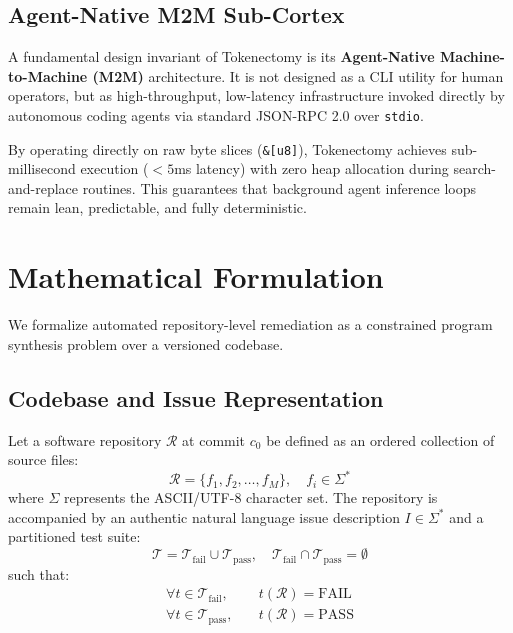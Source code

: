 \documentclass[10pt,twocolumn,letterpaper]{article}
\begin{document}
\subsection{Agent-Native M2M Sub-Cortex}
A fundamental design invariant of Tokenectomy is its \textbf{Agent-Native Machine-to-Machine (M2M)} architecture. It is not designed as a CLI utility for human operators, but as high-throughput, low-latency infrastructure invoked directly by autonomous coding agents via standard JSON-RPC 2.0 over \texttt{stdio}. 

By operating directly on raw byte slices (\texttt{\&[u8]}), Tokenectomy achieves sub-millisecond execution ($<5$ms latency) with zero heap allocation during search-and-replace routines. This guarantees that background agent inference loops remain lean, predictable, and fully deterministic.

\section{Mathematical Formulation}

We formalize automated repository-level remediation as a constrained program synthesis problem over a versioned codebase.

\subsection{Codebase and Issue Representation}
Let a software repository $\mathcal{R}$ at commit $c_0$ be defined as an ordered collection of source files:
\begin{equation}
    \mathcal{R} = \{ f_1, f_2, \dots, f_M \}, \quad f_i \in \Sigma^*
\end{equation}
where $\Sigma$ represents the ASCII/UTF-8 character set. The repository is accompanied by an authentic natural language issue description $I \in \Sigma^*$ and a partitioned test suite:
\begin{equation}
    \mathcal{T} = \mathcal{T}_{\text{fail}} \cup \mathcal{T}_{\text{pass}}, \quad 
    \mathcal{T}_{\text{fail}} \cap \mathcal{T}_{\text{pass}} = \emptyset
\end{equation}
such that:
\begin{align}
    \forall t \in \mathcal{T}_{\text{fail}}, \quad &t(\mathcal{R}) = \text{FAIL} \\
    \forall t \in \mathcal{T}_{\text{pass}}, \quad &t(\mathcal{R}) = \text{PASS}
\end{align}
\end{document}
